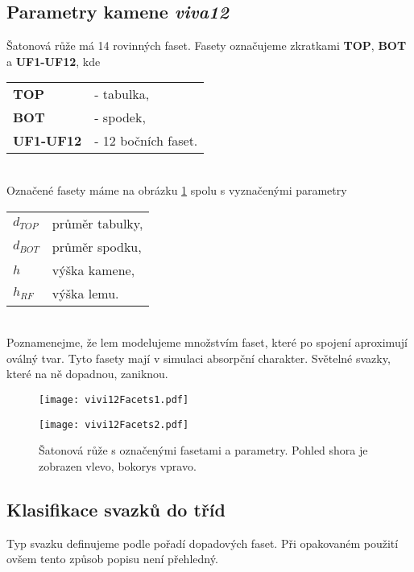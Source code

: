 \subsection{Parametry kamene \textit{viva12}}

Šatonová růže má 14 rovinných faset. Fasety označujeme zkratkami \textbf{TOP}, \textbf{BOT} a \textbf{UF1-UF12}, kde

\begin{tabular}{l l}
\textbf{TOP} & - tabulka,\\
\textbf{BOT} & - spodek,\\
\textbf{UF1-UF12} & - 12 bočních faset.\\
\end{tabular}\\

Označené fasety máme na obrázku \ref{fig:viva12Params} spolu s vyznačenými parametry

\begin{tabular}{l l}
$d_{TOP}$ & průměr tabulky,\\
$d_{BOT}$ & průměr spodku,\\
$h$ & výška kamene,\\
$h_{RF}$ & výška lemu. 
\end{tabular}\\
 
Poznamenejme, že lem modelujeme množstvím faset, které po spojení aproximují oválný tvar. Tyto fasety mají v simulaci absorpční charakter. Světelné svazky, které na ně dopadnou, zaniknou.   

\begin{figure}[htps]
\centering
\begin{minipage}[c]{0.4\textwidth}
\texttt{[image: vivi12Facets1.pdf]}
\end{minipage}
\begin{minipage}[c]{0.56\textwidth}
\texttt{[image: vivi12Facets2.pdf]}
\end{minipage}
\caption{Šatonová růže s označenými fasetami a parametry. Pohled shora je zobrazen vlevo, bokorys vpravo.}
\label{fig:viva12Params}
\end{figure}

\subsection{Klasifikace svazků do tříd}
Typ svazku definujeme podle pořadí dopadových faset. Při opakovaném použití ovšem tento způsob popisu není přehledný.

